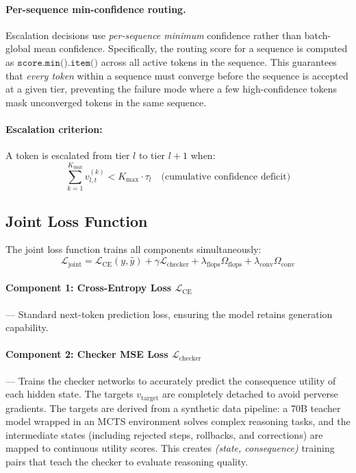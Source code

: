 \documentclass[11pt,a4paper]{article}
\theoremstyle{definition}
\begin{document}
\paragraph{Per-sequence min-confidence routing.} Escalation decisions use \textit{per-sequence minimum} confidence rather than batch-global mean confidence. Specifically, the routing score for a sequence is computed as $\texttt{score.min().item()}$ across all active tokens in the sequence. This guarantees that \textit{every token} within a sequence must converge before the sequence is accepted at a given tier, preventing the failure mode where a few high-confidence tokens mask unconverged tokens in the same sequence.

\paragraph{Escalation criterion:} A token is escalated from tier $l$ to tier $l+1$ when:
\[ \sum_{k=1}^{K_{\max}} v_{l,t}^{(k)} < K_{\max} \cdot \tau_l \quad \text{(cumulative confidence deficit)} \]

\subsection{Joint Loss Function} \label{sec:loss}

The joint loss function trains all components simultaneously:
\[ \mathcal{L}_{\text{joint}} = \mathcal{L}_{\text{CE}}(y, \hat{y}) + \gamma \mathcal{L}_{\text{checker}} + \lambda_{\text{flops}} \Omega_{\text{flops}} + \lambda_{\text{conv}} \Omega_{\text{conv}} \]

\paragraph{Component 1: Cross-Entropy Loss $\mathcal{L}_{\text{CE}}$} --- Standard next-token prediction loss, ensuring the model retains generation capability.

\paragraph{Component 2: Checker MSE Loss $\mathcal{L}_{\text{checker}}$} --- Trains the checker networks to accurately predict the consequence utility of each hidden state. The targets $v_{\text{target}}$ are completely detached to avoid perverse gradients. The targets are derived from a synthetic data pipeline: a 70B teacher model wrapped in an MCTS environment solves complex reasoning tasks, and the intermediate states (including rejected steps, rollbacks, and corrections) are mapped to continuous utility scores. This creates \textit{(state, consequence)} training pairs that teach the checker to evaluate reasoning quality.
\end{document}
